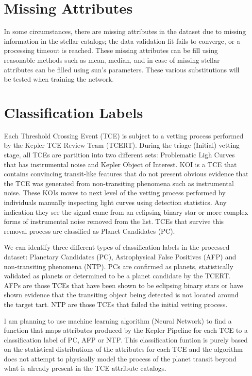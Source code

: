 \section{Missing Attributes}
In some circumstances, there are missing attributes in the dataset due to missing information in the stellar catalogs; the data validation fit fails to converge, or a processing timeout is reached. These missing attributes can be fill using reasonable methods such as mean, median, and in case of missing stellar attributes can be filled using sun's parameters. These various substitutions will be tested when training the network.

\section{Classification Labels}

Each Threshold Crossing Event (TCE) is subject to a vetting process performed by the Kepler TCE Review Team (TCERT). During the triage (Initial) vetting stage, all TCEs are partition into two different sets: Problematic Ligh Curves that has instrumental noise and Kepler Object of Interest. KOI is a TCE that contains convincing transit-like features that do not present obvious evidence that the TCE was generated from non-transiting phenomena such as instrumental noise. These KOIs moves to next level of the vetting process performed by individuals manually inspecting light curves using detection statistics. Any indication they see the signal came from an eclipsing binary star or more complex forms of instrumental noise removed from the list. TCEs that survive this removal process are classified as Planet Candidates (PC).


We can identify three different types of classification labels in the processed dataset: Planetary Candidates (PC), Astrophysical False Positives (AFP) and non-transiting phenomena (NTP). PCs are confirmed as planets, statistically validated as planets or determined to be a planet candidate by the TCERT. AFPs are those TCEs that have been shown to be eclipsing binary stars or have shown evidence that the transiting object being detected is not located around the target tart. NTP are those TCEs that failed the initial vetting process.

I am planning to use machine learning algorithm (Neural Network) to find a function that maps attributes produced by the Kepler Pipeline for each TCE to a classification label of PC, AFP or NTP. This classification funtion is purely based on the statistical distributions of the attributes for each TCE and the algorithm does not attempt to physically model the process of the planet transit beyond what is already present in the TCE attribute catalogs.

